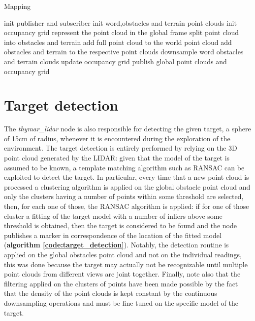 \documentclass[9pt,conference]{IEEEtran}
\begin{document}
\begin{algorithm}[h!]
\caption{Mapping}
\label{alg_mapping}
\begin{algorithmic}
\STATE init publisher and subscriber
\STATE init word,obstacles and terrain point clouds
\STATE init occupancy grid
\STATE represent the point cloud in the global frame
\STATE split point cloud into obstacles and terrain
\STATE add full point cloud to the world point cloud
\STATE add obstacles and terrain to the respective point clouds
\STATE downsample word obstacles and terrain clouds
\STATE update occupancy grid
\ENDIF
\STATE publish global point clouds and occupancy grid
\ENDWHILE 
\end{algorithmic}
\end{algorithm}




\section{Target detection}

The \emph{thymar\_lidar} node is also responsible for detecting the given target, a sphere of 15cm of radius, whenever it is encountered during the exploration of the environment. The target detection is entirely performed by relying on the 3D point cloud generated by the LIDAR: given that the model of the target is assumed to be known, a template matching algorithm such as RANSAC can be exploited to detect the target. In particular, every time that a new point cloud is processed a clustering algorithm is applied on the global obstacle point cloud and only the clusters having a number of points within some threshold are selected, then, for each one of those, the RANSAC algorithm is applied: if for one of those cluster a fitting of the target model with a number of inliers above some threshold is obtained, then the target is considered to be found and the node publishes a marker in correspondence of the location of the fitted model (\textbf{algorithm \ref{code:target_detection}}). Notably, the detection routine is applied on the global obstacles point cloud and not on the individual readings, this was done because the target may actually not be recognizable until multiple point clouds from different views are joint together. Finally, note also that the filtering applied on the clusters of points have been made possible by the fact that the density of the point clouds is kept constant by the continuous downsampling operations and must be fine tuned on the specific model of the target.
\end{document}
